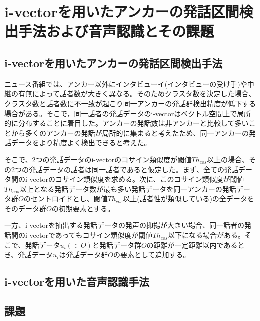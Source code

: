 \chapter{i-vectorを用いたアンカーの発話区間検出手法および音声認識とその課題}

\section{i-vectorを用いたアンカーの発話区間検出手法\cite{nozaki_gakuseikai}}
\label{section:clustering}
ニュース番組では、アンカー以外にインタビューイ(インタビューの受け手)や中継の有無によって話者数が大きく異なる。そのためクラスタ数を決定した場合、クラスタ数と話者数に不一致が起こり同一アンカーの発話群検出精度が低下する場合がある。そこで，同一話者の発話データのi-vectorはベクトル空間上で局所的に分布することに着目した。アンカーの発話数は非アンカーと比較して多いことから多くのアンカーの発話が局所的に集まると考えたため、同一アンカーの発話データをより精度よく検出できると考えた。\par
そこで、2つの発話データのi-vectorのコサイン類似度が閾値$Th_{cos}$以上の場合、その2つの発話データの話者は同一話者であると仮定した。まず、全ての発話データ間のi-vectorのコサイン類似度を求める。次に、このコサイン類似度が閾値$Th_{cos}$以上となる発話データ数が最も多い発話データを同一アンカーの発話データ群$O$のセントロイドとし、閾値$Th_{cos}$以上(話者性が類似している)の全データをそのデータ群$O$の初期要素とする。\par
一方、i-vectorを抽出する発話データの発声の抑揚が大きい場合、同一話者の発話間のi-vectorであってもコサイン類似度が閾値$Th_{cos}$以下になる場合がある。そこで、発話データ$u_i(\in O)$と発話データ群$O$の距離が一定距離以内であるとき、発話データ$u_i$は発話データ群$O$の要素として追加する。

\section{i-vectorを用いた音声認識手法}
\label{section:yoshimura_pre_clustering}
\section{課題}

